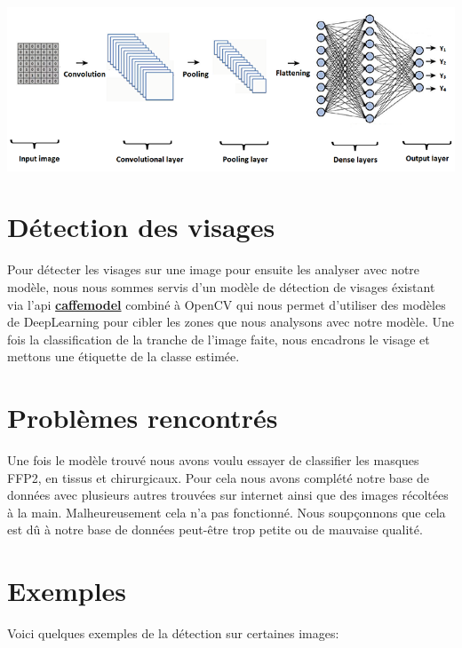 \begin{center}
    \includegraphics[scale=0.6]{resources/cnn.png}
\end{center}

\section{Détection des visages}
Pour détecter les visages sur une image pour ensuite les analyser avec notre modèle, nous nous sommes servis d'un modèle de détection de visages éxistant via l'api \textbf{\href{https://fileinfo.com/extension/caffemodel}{caffemodel}} combiné à OpenCV qui nous permet d'utiliser des modèles de DeepLearning pour cibler les zones que nous analysons avec notre modèle.
Une fois la classification de la tranche de l'image faite, nous encadrons le visage et mettons une étiquette de la classe estimée.

\clearpage
\section{Problèmes rencontrés}

Une fois le modèle trouvé nous avons voulu essayer de classifier les masques FFP2, en tissus et chirurgicaux. Pour cela nous avons complété notre base de données avec plusieurs autres trouvées sur internet ainsi que des images récoltées à la main. Malheureusement cela n’a pas fonctionné. Nous soupçonnons que cela est dû à notre base de données peut-être trop petite ou de mauvaise qualité.


\section{Exemples}
Voici quelques exemples de la détection sur certaines images:\\


